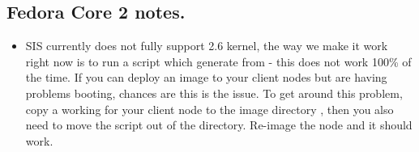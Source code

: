 \subsection{Fedora Core 2 notes.}
\label{subsec:fc2notes}

\begin{itemize}

\item SIS currently does not fully support 2.6 kernel, the way we make it
  work right now is to run a script which generate  
  from  - this does not work 100\% of the time.  If 
  you can deploy an image to your client nodes but are having problems 
  booting, chances are this is the issue.  To get around this problem, copy a
  working  for your client node to the image directory 
  ,
  then you also need to move the script 
  out of the directory.  Re-image the node and it should work.

\end{itemize}

